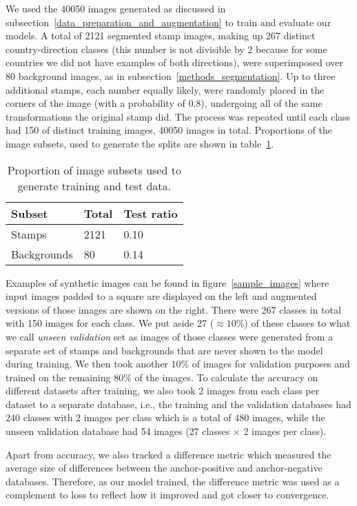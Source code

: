 \documentclass[twocolumn]{svjour3}
\begin{document}
We used the 40050 images generated as discussed in subsection~\ref{data_preparation_and_augmentation} to train and evaluate our models. A total of 2121 segmented stamp images, making up 267 distinct country-direction classes (this number is not divisible by 2 because for some countries we did not have examples of both directions), were superimposed over 80 background images, as in subsection~\ref{methods_segmentation}. Up to three additional stamps, each number equally likely, were randomly placed in the corners of the image (with a probability of 0.8), undergoing all of the same transformations the original stamp did. The process was repeated until each class had 150 of distinct training images, 40050 images in total. Proportions of the image subsets, used to generate the splits are shown in table~\ref{tab:stamp_bg_split}.

\begin{table}[!ht]
    \centering
    \caption{Proportion of image subsets used to generate training and test data.}
    \begin{tabular}{@{}lll@{}}
        \toprule
        Subset & Total & Test ratio \\ \midrule
        Stamps & 2121 & 0.10 \\
        Backgrounds & 80 & 0.14 \\ \bottomrule
    \end{tabular}
    \label{tab:stamp_bg_split}
\end{table}


Examples of synthetic images can be found in figure~\ref{sample_images} where input images padded to a square are displayed on the left and augmented versions of those images are shown on the right. There were 267 classes in total with 150 images for each class. We put aside 27 ($\approx 10\%$) of these classes to what we call \textit{unseen validation} set as images of those classes were generated from a separate set of stamps and backgrounds that are never shown to the model during training. We then took another $10\%$ of images for validation purposes and trained on the remaining $80\%$ of the images. To calculate the accuracy on different datasets after training, we also took 2 images from each class per dataset to a separate database, i.e., the training and the validation databases had 240 classes with 2 images per class which is a total of 480 images, while the unseen validation database had 54 images (27 classes $\times$ 2 images per class).

Apart from accuracy, we also tracked a difference metric which measured the average size of differences between the anchor-positive and anchor-negative databases. Therefore, as our model trained, the difference metric was used as a complement to loss to reflect how it improved and got closer to convergence.
\end{document}
